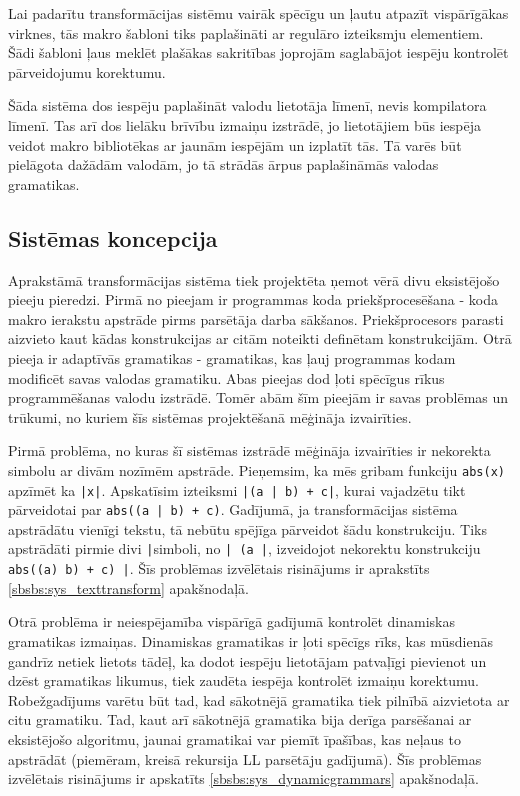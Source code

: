 Lai padarītu transformācijas sistēmu vairāk spēcīgu un ļautu atpazīt vispārīgākas virknes, tās makro šabloni tiks paplašināti ar regulāro izteiksmju elementiem. Šādi šabloni ļaus meklēt plašākas sakritības joprojām saglabājot iespēju kontrolēt pārveidojumu korektumu.

Šāda sistēma dos iespēju paplašināt valodu lietotāja līmenī, nevis kompilatora līmenī. Tas arī dos lielāku brīvību izmaiņu izstrādē, jo lietotājiem būs iespēja veidot makro bibliotēkas ar jaunām iespējām un izplatīt tās. Tā varēs būt pielāgota dažādām valodām, jo tā strādās ārpus paplašināmās valodas gramatikas.

\subsection{\label{sbs:sys_approach}Sistēmas koncepcija}

Aprakstāmā transformācijas sistēma tiek projektēta ņemot vērā divu eksistējošo pieeju pieredzi. Pirmā no pieejam ir programmas koda priekšprocesēšana - koda makro ierakstu apstrāde pirms parsētāja darba sākšanos. Priekšprocesors parasti aizvieto kaut kādas konstrukcijas ar citām noteikti definētam konstrukcijām. Otrā pieeja ir adaptīvās gramatikas - gramatikas, kas ļauj programmas kodam modificēt savas valodas gramatiku. Abas pieejas dod ļoti spēcīgus rīkus programmēšanas valodu izstrādē. Tomēr abām šīm pieejām ir savas problēmas un trūkumi, no kuriem šīs sistēmas projektēšanā mēģināja izvairīties. 

Pirmā problēma, no kuras šī sistēmas izstrādē mēģināja izvairīties ir nekorekta simbolu ar divām nozīmēm apstrāde. Pieņemsim, ka mēs gribam funkciju \verb|abs(x)| apzīmēt ka \verb/|x|/. Apskatīsim izteiksmi \verb/|(a | b) + c|/, kurai vajadzētu tikt pārveidotai par \verb/abs((a | b) + c)/. Gadījumā, ja transformācijas sistēma apstrādātu vienīgi tekstu, tā nebūtu spējīga pārveidot šādu konstrukciju. Tiks apstrādāti pirmie divi \verb/|/simboli, no \verb/| (a |/, izveidojot nekorektu konstrukciju \verb/abs((a) b) + c) |/. Šīs problēmas izvēlētais risinājums ir aprakstīts \ref{sbsbs:sys_texttransform} apakšnodaļā.

Otrā problēma ir neiespējamība vispārīgā gadījumā kontrolēt dinamiskas gramatikas izmaiņas. Dinamiskas gramatikas ir ļoti spēcīgs rīks, kas mūsdienās gandrīz netiek lietots tādēļ, ka dodot iespēju lietotājam patvaļīgi pievienot un dzēst gramatikas likumus, tiek zaudēta iespēja kontrolēt izmaiņu korektumu. Robežgadījums varētu būt tad, kad sākotnējā gramatika tiek pilnībā aizvietota ar citu gramatiku. Tad, kaut arī sākotnējā gramatika bija derīga parsēšanai ar eksistējošo algoritmu, jaunai gramatikai var piemīt īpašības, kas neļaus to apstrādāt (piemēram, kreisā rekursija LL parsētāju gadījumā). Šīs problēmas izvēlētais risinājums ir apskatīts \ref{sbsbs:sys_dynamicgrammars} apakšnodaļā.

